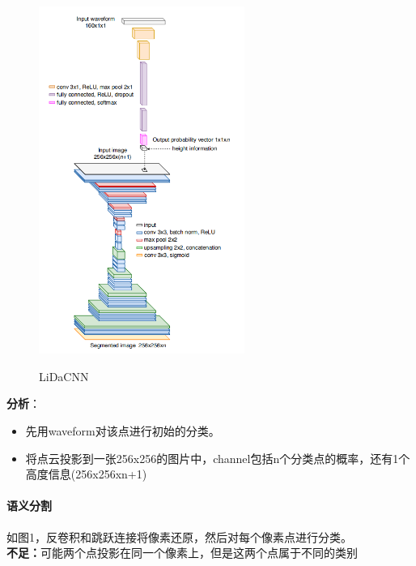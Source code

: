 \documentclass[a4paper,12pt]{article}
\begin{document}
	\begin{figure}[H]
	\begin{center}
		\includegraphics[width=0.6\textwidth]{img/LiDaCNN.png} 
		\caption{LiDaCNN}
	\end{center}
\end{figure}


\textbf{分析}：
\begin{itemize}
	\item 先用waveform对该点进行初始的分类。
	\item 将点云投影到一张256x256的图片中，channel包括n个分类点的概率，还有1个高度信息(256x256xn+1)
\end{itemize}

\paragraph{语义分割} 如图1，反卷积和跳跃连接将像素还原，然后对每个像素点进行分类。\\
\textbf{不足：}可能两个点投影在同一个像素上，但是这两个点属于不同的类别
\end{document}
